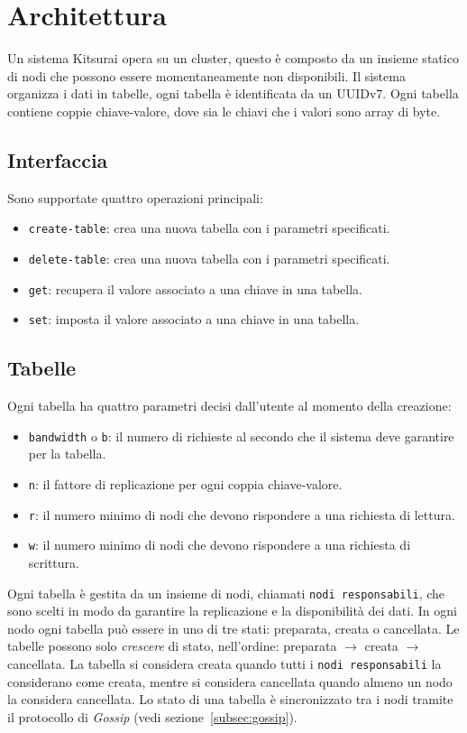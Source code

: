 \section{Architettura}
\label{sec:architettura}

Un sistema Kitsurai opera su un cluster, questo è composto da un insieme statico di nodi che possono essere momentaneamente non disponibili.
Il sistema organizza i dati in tabelle, ogni tabella è identificata da un UUIDv7.
Ogni tabella contiene coppie chiave-valore, dove sia le chiavi che i valori sono array di byte.

\subsection{Interfaccia}
\label{subsec:interfaccia}

Sono supportate quattro operazioni principali:
\begin{itemize}
    \item \texttt{create-table}: crea una nuova tabella con i parametri specificati.
    \item \texttt{delete-table}: crea una nuova tabella con i parametri specificati.
    \item \texttt{get}: recupera il valore associato a una chiave in una tabella.
    \item \texttt{set}: imposta il valore associato a una chiave in una tabella.
\end{itemize}

\subsection{Tabelle}
\label{subsec:tabelle}

Ogni tabella ha quattro parametri decisi dall'utente al momento della creazione:
\begin{itemize}
    \item \texttt{bandwidth} o \texttt{b}: il numero di richieste al secondo che il sistema deve garantire per la tabella.
    \item \texttt{n}: il fattore di replicazione per ogni coppia chiave-valore.
    \item \texttt{r}: il numero minimo di nodi che devono rispondere a una richiesta di lettura.
    \item \texttt{w}: il numero minimo di nodi che devono rispondere a una richiesta di scrittura.
\end{itemize}

Ogni tabella è gestita da un insieme di nodi, chiamati \texttt{nodi responsabili}, che sono scelti in modo da garantire la replicazione e la disponibilità dei dati.
In ogni nodo ogni tabella può essere in uno di tre stati: preparata, creata o cancellata.
Le tabelle possono solo \textit{crescere} di stato, nell'ordine: preparata $\rightarrow$ creata $\rightarrow$ cancellata.
La tabella si considera creata quando tutti i \texttt{nodi responsabili} la considerano come creata,
mentre si considera cancellata quando almeno un nodo la considera cancellata.
Lo stato di una tabella è sincronizzato tra i nodi tramite il protocollo di \textit{Gossip} (vedi sezione~\ref{subsec:gossip}).

